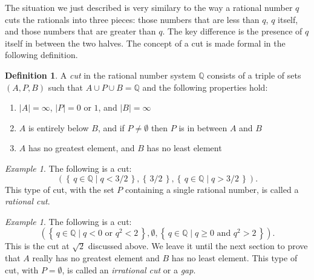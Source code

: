\documentclass[11pt,oneside]{amsbook}
\newcommand{\set}[1]{\left\{\,#1\,\right\}}
\newcommand{\Q}{\mathbb Q}
\theoremstyle{definition}
\theoremstyle{plain}
\theoremstyle{definition}
\newtheorem{definition}[theorem]{Definition}
\theoremstyle{remark}
\newtheorem{example}[theorem]{Example}
\numberwithin{equation}{section}
\numberwithin{figure}{section}
\begin{document}
The situation we just described is very similary to the way a rational number $q$ cuts the rationals into three pieces: those numbers that are less than $q$, $q$ itself, and those numbers that are greater than $q$. The key difference is the presence of $q$ itself in between the two halves. The concept of a cut is made formal in the following definition.

\begin{definition}
  \label{def:cut}
  A \emph{cut} in the rational number system $\Q$ consists of a triple of sets $(A,P,B)$ such that $A\cup P\cup B=\Q$ and the following properties hold:
  \begin{enumerate}
    \item $|A|=\infty$, $|P|=0$ or $1$, and $|B|=\infty$
    \item $A$ is entirely below $B$, and if $P\neq\emptyset$ then $P$ is in between $A$ and $B$
    \item $A$ has no greatest element, and $B$ has no least element
  \end{enumerate}
\end{definition}

\begin{example}
  The following is a cut:
  \begin{equation}
    \label{eq:rationalcut}
    \left(\set{q\in\Q\mid q<3/2},\set{3/2},\set{q\in\Q\mid q>3/2}\right)\text{.}
  \end{equation}
  This type of cut, with the set $P$ containing a single rational number, is called a \emph{rational cut}.

  \begin{center}
  \end{center}
\end{example}

\begin{example}
  The following is a cut:
  \begin{equation}
    \label{eq:irrationalcut}
    \left(\set{q\in\Q\mid q<0\text{ or }q^2<2},\emptyset,\set{q\in\Q\mid q\geq0\text{ and }q^2>2}\right)\text{.}
  \end{equation}
  This is the cut at $\sqrt{2}$ discussed above. We leave it until the next section to prove that $A$ really has no greatest element and $B$ has no least element. This type of cut, with $P=\emptyset$, is called an \emph{irrational cut} or a \emph{gap}.
  
  \begin{center}
  \end{center}
\end{example}
\end{document}
